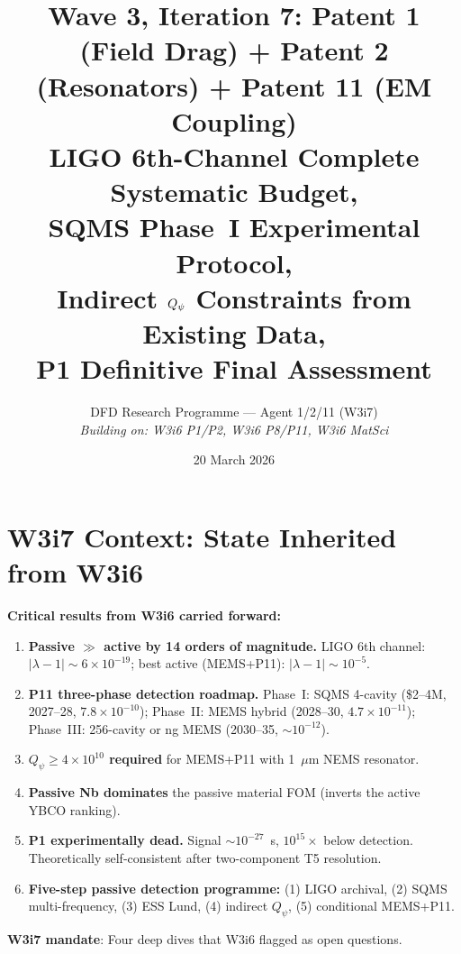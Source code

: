 \documentclass[11pt]{article}
\title{Wave 3, Iteration 7: Patent 1 (Field Drag) + Patent 2 (Resonators)
+ Patent 11 (EM Coupling)\\
\large LIGO 6th-Channel Complete Systematic Budget,\\
SQMS Phase~I Experimental Protocol,\\
Indirect $\Qpsi$ Constraints from Existing Data,\\
P1 Definitive Final Assessment}
\author{DFD Research Programme --- Agent 1/2/11 (W3i7)\\
\textit{Building on: W3i6 P1/P2, W3i6 P8/P11, W3i6 MatSci}}
\date{20 March 2026}
\newcommand{\lam}{\lambda}
\newcommand{\ee}[1]{\times 10^{#1}}
\newcommand{\Qpsi}{Q_\psi}
\newcommand{\lbone}{|\lam - 1|}
\theoremstyle{definition}
\theoremstyle{remark}
\begin{document}
\maketitle
\tableofcontents
\newpage

\section*{W3i7 Context: State Inherited from W3i6}

\noindent\textbf{Critical results from W3i6 carried forward:}

\begin{enumerate}[nosep]
\item \textbf{Passive $\gg$ active by 14 orders of magnitude.}
  LIGO 6th channel: $\lbone \sim 6\ee{-19}$; best active (MEMS+P11):
  $\lbone \sim 10^{-5}$.
\item \textbf{P11 three-phase detection roadmap.}
  Phase~I: SQMS 4-cavity (\$2--4M, 2027--28, $7.8\ee{-10}$);
  Phase~II: MEMS hybrid (2028--30, $4.7\ee{-11}$);
  Phase~III: 256-cavity or ng MEMS (2030--35, $\sim 10^{-12}$).
\item \textbf{$\Qpsi \geq 4\ee{10}$ required} for MEMS+P11 with
  1~$\mu$m NEMS resonator.
\item \textbf{Passive Nb dominates} the passive material FOM
  (inverts the active YBCO ranking).
\item \textbf{P1 experimentally dead.} Signal $\sim 10^{-27}$~s,
  $10^{15}\times$ below detection. Theoretically self-consistent
  after two-component T5 resolution.
\item \textbf{Five-step passive detection programme:}
  (1) LIGO archival, (2) SQMS multi-frequency, (3) ESS Lund,
  (4) indirect $\Qpsi$, (5) conditional MEMS+P11.
\end{enumerate}

\noindent\textbf{W3i7 mandate}: Four deep dives that W3i6 flagged as
open questions.
\end{document}
